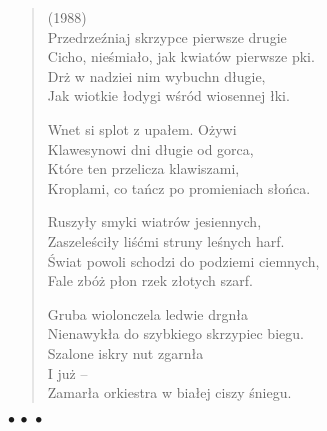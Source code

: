 \documentclass{article} %
\newenvironment{wierszd}[2]
	{\begin{verse} \hspace*{-1em}{\bf #1}\hfill{\small{(#2)}}\\[.5ex] }
	{\end{verse} \begin{center}$\bullet\ \bullet\ \bullet$\end{center}}
\newcommand{\e}{\eob}
\renewcommand{\a}{\aob}
\renewcommand{\o}{\'{o}}
\newcommand{\z}{\'{z}}
\newcommand{\n}{\'{n}}
\newcommand{\s}{\'{s}}
\renewcommand{\S}{\'{S}}
\newcommand{\ci}{\'{c}}
\begin{document}
\begin{wierszd} {Vivaldi - 4 pory roku}{1988}
Przedrze{\z}niaj{\a} skrzypce pierwsze drugie \\ 
Cicho, nie{\s}mia{\l}o, jak kwiat{\o}w pierwsze p{\a}ki. \\ 
Dr\.{z}{\a} w nadziei nim wybuchn{\a} d{\l}ugie, \\ 
Jak wiotkie {\l}odygi w{\s}r{\o}d wiosennej {\l}{\a}ki.  

Wnet si{\e} splot{\a} z upa{\l}em. O\.{z}ywi{\a} \\ 
Klawesynowi dni d{\l}ugie od gor{\a}ca, \\ 
Kt{\o}re ten przelicza klawiszami, \\ 
Kroplami, co ta{\n}cz{\a} po promieniach s{\l}o{\n}ca.  

Ruszy{\l}y smyki wiatr{\o}w jesiennych, \\ 
Zaszele{\s}ci{\l}y li{\s}{\ci}mi struny le{\s}nych harf. \\ 
{\S}wiat powoli schodzi do podziemi ciemnych, \\ 
Fale zb{\o}\.{z} p{\l}on{\a} rzek{\a} z{\l}otych szarf. 

Gruba wiolonczela ledwie drgn{\e}{\l}a \\ 
Nienawyk{\l}a do szybkiego skrzypiec biegu. \\ 
Szalone iskry nut zgarn{\e}{\l}a \\ 
I ju\.{z} --  \\ 
Zamar{\l}a orkiestra w bia{\l}ej ciszy {\s}niegu.

\end{wierszd}
\end{document}
